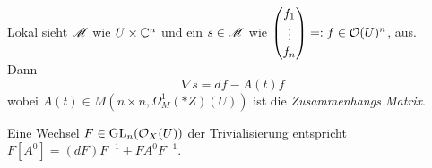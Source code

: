 \begin{rem}
  Lokal sieht $\mathscr{M}$ wie $U\times\mathbb{C}^n$ und ein $s\in\mathscr{M}$ wie
  $\begin{pmatrix}f_{1}\\\vdots\\f_{n}\end{pmatrix}=:f\in\mathcal{O}(U)^n$, aus.
  \\Dann
  \[
    \nabla s=df - A(t)f
  \]
  wobei $A(t)\in M(n\times n,\Omega_M^1(*Z)(U))$ ist die \emph{Zusammenhangs
  Matrix}.
  \begin{comment}
    Klassifiziere diese durch die Lösung der DGL $\nabla s=0$.
  \end{comment}
  Eine Wechsel $F\in\operatorname{GL}_n(\mathcal{O}_X(U))$ der Trivialisierung entspricht 
  $F[A^0]=(dF)F^{-1}+FA^0F^{-1}$.
\end{rem}
\begin{comment}
  Irregularität von meromorphen Zusammenhängen
  \\\TODO[\cite{sabbah2007isomonodromic}: p. 86]
  \TODO[\cite{sabbah2007isomonodromic}: Def II.2.24]
\end{comment}
